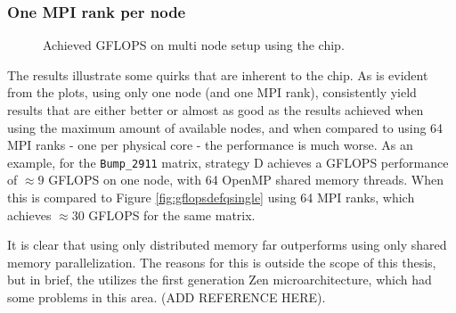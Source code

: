 \subsubsection{One MPI rank per node}
\begin{figure}[H]
    \centering
    \caption{Achieved GFLOPS on multi node setup using the  chip.}
    \label{fig:gflopsdefqmulti}
\end{figure}
\medskip

The results illustrate some quirks that are inherent to the  chip. As is evident from the plots, using only one node (and one MPI rank), consistently yield results that are either better or almost as good as the results achieved when using the maximum amount of available nodes, and when compared to using 64 MPI ranks - one per physical core - the performance is much worse. As an example, for the \texttt{Bump\_2911} matrix, strategy D achieves a GFLOPS performance of \(\approx 9\) GFLOPS on one node, with 64 OpenMP shared memory threads. When this is compared to Figure \ref{fig:gflopsdefqsingle} using 64 MPI ranks, which achieves \(\approx 30\) GFLOPS for the same matrix.
\medskip

It is clear that using only distributed memory far outperforms using only shared memory parallelization. The reasons for this is outside the scope of this thesis, but in brief, the  utilizes the first generation Zen microarchitecture, which had some problems in this area. (ADD REFERENCE HERE).


\begin{figure}[H]
    \centering
    \caption{}
    \label{fig:tcommdefqmulti}
\end{figure}


\begin{figure}[H]
    \centering
    \caption{}
    \label{}
\end{figure}

